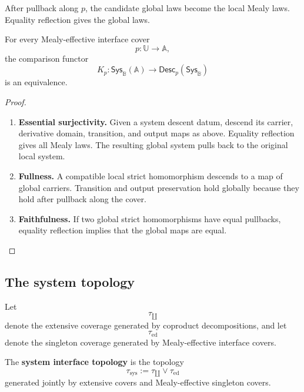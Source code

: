 After pullback along \(p\), the candidate global laws become the local Mealy
laws. Equality reflection gives the global laws.

\begin{theorem}
\label{thm:effective-descent-strict-mealy}
For every Mealy-effective interface cover
\[
    p:\mathbb U\to\mathbb A,
\]
the comparison functor
\[
    K_p:
    \mathsf{Sys}_{\mathbb B}(\mathbb A)
    \longrightarrow
    \mathsf{Desc}_p(\mathsf{Sys}_{\mathbb B})
\]
is an equivalence.
\end{theorem}

\begin{proof}
\leavevmode
\begin{enumerate}
    \item \textbf{Essential surjectivity.}
    Given a system descent datum, descend its carrier, derivative domain,
    transition, and output maps as above. Equality reflection gives all Mealy
    laws. The resulting global system pulls back to the original local system.

    \item \textbf{Fullness.}
    A compatible local strict homomorphism descends to a map of global
    carriers. Transition and output preservation hold globally because they
    hold after pullback along the cover.

    \item \textbf{Faithfulness.}
    If two global strict homomorphisms have equal pullbacks, equality
    reflection implies that the global maps are equal.
\end{enumerate}
\end{proof}

\subsection{The system topology}
\label{subsec:system-topology}

Let
\[
    \tau_{\amalg}
\]
denote the extensive coverage generated by coproduct decompositions, and let
\[
    \tau_{\mathrm{ed}}
\]
denote the singleton coverage generated by Mealy-effective interface covers.

\begin{definition}
\label{def:system-interface-topology}
The \textbf{system interface topology} is the topology
\[
    \tau_{\mathrm{sys}}
    :=
    \tau_{\amalg}\vee\tau_{\mathrm{ed}}
\]
generated jointly by extensive covers and Mealy-effective singleton covers.
\end{definition}

